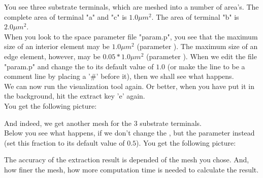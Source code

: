 \noindent
You see three substrate terminals, which are meshed into a number of area's.
The complete area of terminal "a" and "c" is $1.0 \mu m^2$.
The area of terminal "b" is $2.0 \mu m^2$.
\\[1 ex]
When you look to the space parameter file "param.p",
you see that the maximum size of an interior element may be $1.0 \mu m^2$
(parameter ).
The maximum size of an edge element, however, may be $0.05 * 1.0 \mu m^2$
(parameter ).
When we edit the file "param.p" and change the  to its default value of $1.0$
(or make the line to be a comment line by placing a '\#' before it),
then we shall see what happens.
\\[1 ex]
We can now run the visualization tool again.
Or better, when you have put it in the background, hit the extract key 'e' again.
\\[1 ex]
You get the following picture:
\newpage
\begin{figure}[h]
\centerline{}
\end{figure}

\noindent
And indeed, we get another mesh for the 3 substrate terminals.
\\[1 ex]
Below you see what happens, if we don't change the ,
but the  parameter instead (set this fraction to its default value of $0.5$).
You get the following picture:
\begin{figure}[h]
\centerline{}
\end{figure}

\noindent
The accuracy of the extraction result is depended of the mesh you chose.
And, how finer the mesh, how more computation time is needed to calculate the result.

